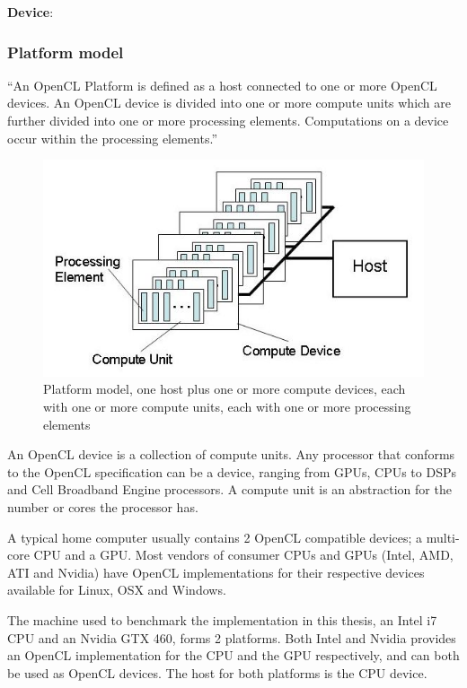 \vspace{5mm} \textbf{Device}:


\subsubsection{Platform model}

``An OpenCL Platform is defined as a host connected to one or more
OpenCL devices. An OpenCL device is divided into one or more compute
units which are further divided into one or more processing elements.
Computations on a device occur within the processing elements.''
\cite{cl-spec}

\begin{figure}
  \includegraphics[width=\textwidth]{images/platform-model.png}
  \caption{Platform model, one host plus one or more compute devices,
    each with one or more compute units, each with one or more
    processing elements}
  \label{platform-model-figure}
\end{figure}

An OpenCL device is a collection of compute units. Any processor that
conforms to the OpenCL specification can be a device, ranging from
GPUs, CPUs to DSPs and Cell Broadband Engine processors. A compute
unit is an abstraction for the number or cores the processor has.

A typical home computer usually contains 2 OpenCL compatible devices;
a multi-core CPU and a GPU. Most vendors of consumer CPUs and GPUs
(Intel, AMD, ATI and Nvidia) have OpenCL implementations for their
respective devices available for Linux, OSX and Windows.

The machine used to benchmark the implementation in this thesis, an
Intel i7 CPU and an Nvidia GTX 460, forms 2 platforms. Both Intel and
Nvidia provides an OpenCL implementation for the CPU and the GPU
respectively, and can both be used as OpenCL devices. The host for
both platforms is the CPU device.

